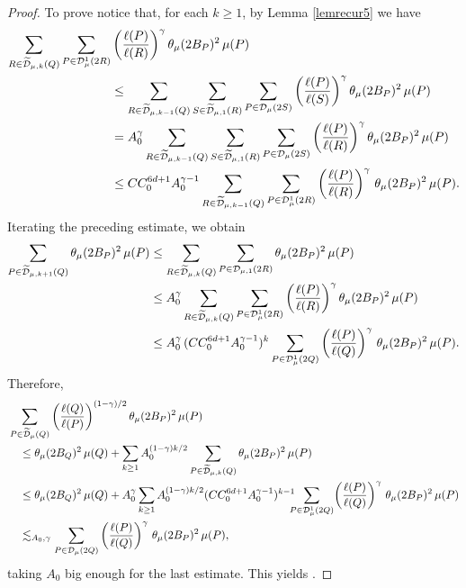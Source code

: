 \begin{proof}
	To prove  notice that, for each $k\geq1$, by Lemma \ref{lemrecur5} we have
	\begin{align*}
		\sum_{R\in{\widetilde{{\mathcal D}}}_{\mu,k}(Q)}
		\sum_{P\in {\mathcal D}_{\mu}^1(2R)} &\left(\frac{\ell(P)}{\ell(R)}\right)^\gamma \theta_\mu(2B_P)^2 \,\mu(P)\\
		&\leq \sum_{R\in{\widetilde{{\mathcal D}}}_{\mu,k-1}(Q)}
		\sum_{S\in{\widetilde{{\mathcal D}}}_{\mu,1}(R)} 
		\sum_{P\in {\mathcal D}_{\mu}(2S)}  \left(\frac{\ell(P)}{\ell(S)}\right)^\gamma\theta_\mu(2B_P)^2 \,\mu(P)\\
		& = A_0^{\gamma} \sum_{R\in{\widetilde{{\mathcal D}}}_{\mu,k-1}(Q)}
		\sum_{S\in{\widetilde{{\mathcal D}}}_{\mu,1}(R)} 
		\sum_{P\in {\mathcal D}_{\mu}(2S)}  \left(\frac{\ell(P)}{\ell(R)}\right)^\gamma\theta_\mu(2B_P)^2 \,\mu(P)\\
		& \leq C C_0^{6d+1} A_0^{\gamma-1} \sum_{R\in{\widetilde{{\mathcal D}}}_{\mu,k-1}(Q)}
		\sum_{P\in {\mathcal D}_\mu^1(2R)}\left(\frac{\ell(P)}{\ell(R)}\right)^\gamma\, \theta_\mu(2B_P)^2\,\mu(P).
	\end{align*}
	Iterating the preceding estimate, we obtain
	\begin{align*}
		\sum_{P\in{\widetilde{{\mathcal D}}}_{\mu,k+1}(Q)} 
		\theta_\mu(2B_P)^2 \,\mu(P) & \leq 
		\sum_{R\in{\widetilde{{\mathcal D}}}_{\mu,k}(Q)}
		\sum_{P\in {\mathcal D}_{\mu,1}(2R)} \theta_\mu(2B_P)^2 \,\mu(P)\\
		& \leq A_0^\gamma\sum_{R\in{\widetilde{{\mathcal D}}}_{\mu,k}(Q)}
		\sum_{P\in {\mathcal D}_{\mu}^1(2R)} \left(\frac{\ell(P)}{\ell(R)}\right)^\gamma \theta_\mu(2B_P)^2 \,\mu(P)\\
		& \leq A_0^\gamma\,(C C_0^{6d+1} A_0^{\gamma-1})^k \sum_{P\in {\mathcal D}_\mu^1(2Q)}\left(\frac{\ell(P)}{\ell(Q)}\right)^\gamma\, \theta_\mu(2B_P)^2\,\mu(P).
	\end{align*}
	Therefore,
	\begin{align*}
		&\sum_{P\in{\widetilde{{\mathcal D}}}_\mu(Q)} \left(\frac{\ell(Q)}{\ell(P)}\right)^{(1-\gamma)/2}\theta_\mu(2B_P)^2
		\,\mu(P)\\
		& \quad\leq \theta_\mu(2B_Q)^2\,\mu(Q) + \sum_{k\geq1} A_0^{(1-\gamma) k/2}\sum_{P\in{\widetilde{{\mathcal D}}}_{\mu,k}(Q)} \theta_\mu(2B_P)^2
		\,\mu(P)\\
		& \quad\leq \theta_\mu(2B_Q)^2\,\mu(Q) + A_0^\gamma\sum_{k\geq1} A_0^{(1-\gamma) k/2}(C C_0^{6d+1} A_0^{\gamma-1})^{k-1}\!\!\!\!
		\sum_{P\in {\mathcal D}_\mu^1(2Q)}\!\left(\frac{\ell(P)}{\ell(Q)}\right)^\gamma\, \theta_\mu(2B_P)^2\,\mu(P)\\
		& \quad\lesssim_{A_0,\gamma} \sum_{P\in {\mathcal D}_\mu(2Q)}\left(\frac{\ell(P)}{\ell(Q)}\right)^\gamma\, \theta_\mu(2B_P)^2\,\mu(P),
	\end{align*}
	taking $A_0$ big enough for the last estimate. This yields .
\end{proof}




\vv
